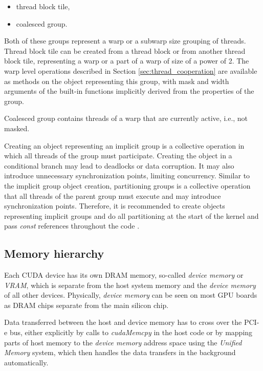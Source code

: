 \begin{itemize}
	\item thread block tile,
	\item coalesced group.
\end{itemize}

Both of these groups represent a warp or a subwarp size grouping of threads. Thread block tile can be created from a thread block or from another thread block tile, representing a warp or a part of a warp of size of a power of 2. The warp level operations described in Section \ref{sec:thread_cooperation} are available as methods on the object representing this group, with mask and width arguments of the built-in functions implicitly derived from the properties of the group. 

Coalesced group contains threads of a warp that are currently active, i.e., not masked.

Creating an object representing an implicit group is a collective operation in which all threads of the group must participate. Creating the object in a conditional branch may lead to deadlocks or data corruption. It may also introduce unnecessary synchronization points, limiting concurrency. Similar to the implicit group object creation, partitioning groups is a collective operation that all threads of the parent group must execute and may introduce synchronization points. Therefore, it is recommended to create objects representing implicit groups and do all partitioning at the start of the kernel and pass \textit{const} references throughout the code \cite{site:cuda}.

\subsection{Memory hierarchy}
\label{sec:memory_hierarchy}

Each CUDA device has its own DRAM memory, so-called \textit{device memory} or \textit{VRAM}, which is separate from the host system memory and the \textit{device memory} of all other devices. Physically, \textit{device memory} can be seen on most GPU boards as DRAM chips separate from the main silicon chip.

Data transferred between the host and device memory has to cross over the PCI-e bus, either explicitly by calls to \textit{cudaMemcpy} in the host code or by mapping parts of host memory to the \textit{device memory} address space using the \textit{Unified Memory} system, which then handles the data transfers in the background automatically.

